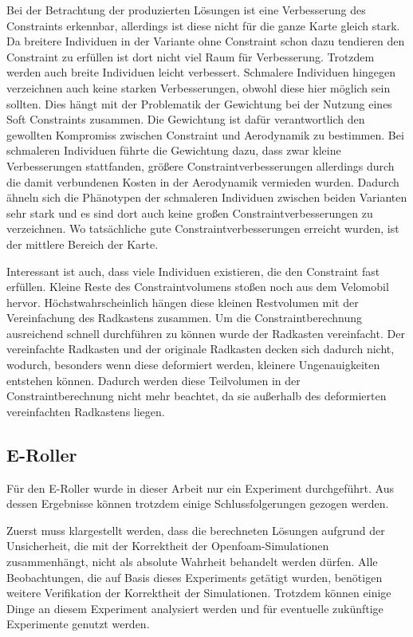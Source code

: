 Bei der Betrachtung der produzierten Lösungen ist eine Verbesserung des Constraints erkennbar, allerdings ist diese nicht für die ganze Karte gleich stark.
Da breitere Individuen in der Variante ohne Constraint schon dazu tendieren den Constraint zu erfüllen ist dort nicht viel Raum für Verbesserung.
Trotzdem werden auch breite Individuen leicht verbessert.
Schmalere Individuen hingegen verzeichnen auch keine starken Verbesserungen, obwohl diese hier möglich sein sollten.
Dies hängt mit der Problematik der Gewichtung bei der Nutzung eines Soft Constraints zusammen.
Die Gewichtung ist dafür verantwortlich den gewollten Kompromiss zwischen Constraint und Aerodynamik zu bestimmen.
Bei schmaleren Individuen führte die Gewichtung dazu, dass zwar kleine Verbesserungen stattfanden, größere Constraintverbesserungen allerdings durch die damit verbundenen Kosten in der Aerodynamik vermieden wurden.
Dadurch ähneln sich die Phänotypen der schmaleren Individuen zwischen beiden Varianten sehr stark und es sind dort auch keine großen Constraintverbesserungen zu verzeichnen.
Wo tatsächliche gute Constraintverbesserungen erreicht wurden, ist der mittlere Bereich der Karte.

Interessant ist auch, dass viele Individuen existieren, die den Constraint fast erfüllen.
Kleine Reste des Constraintvolumens stoßen noch aus dem Velomobil hervor.
Höchstwahrscheinlich hängen diese kleinen Restvolumen mit der Vereinfachung des Radkastens zusammen.
Um die Constraintberechnung ausreichend schnell durchführen zu können wurde der Radkasten vereinfacht.
Der vereinfachte Radkasten und der originale Radkasten decken sich dadurch nicht, wodurch, besonders wenn diese deformiert werden, kleinere Ungenauigkeiten entstehen können.
Dadurch werden diese Teilvolumen in der Constraintberechnung nicht mehr beachtet, da sie außerhalb des deformierten vereinfachten Radkastens liegen.



\subsection{E-Roller}

Für den E-Roller wurde in dieser Arbeit nur ein Experiment durchgeführt.
Aus dessen Ergebnisse können trotzdem einige Schlussfolgerungen gezogen werden.

Zuerst muss klargestellt werden, dass  die berechneten Lösungen aufgrund der Unsicherheit, die mit der Korrektheit der Openfoam-Simulationen zusammenhängt, nicht als absolute Wahrheit behandelt werden dürfen.
Alle Beobachtungen, die auf Basis dieses Experiments getätigt wurden, benötigen weitere Verifikation der Korrektheit der Simulationen.
Trotzdem können einige Dinge an diesem Experiment analysiert werden und für eventuelle zukünftige Experimente genutzt werden.

